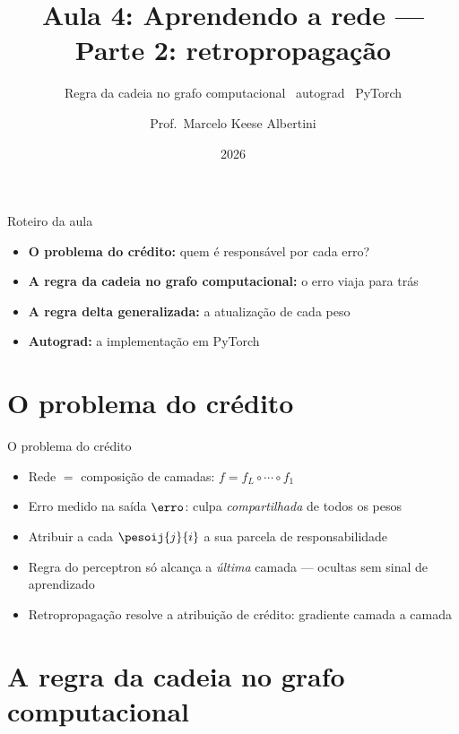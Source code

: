 \documentclass[aspectratio=169, 11pt]{beamer}
\title[Aula 4 — Retropropagação]{Aula 4: Aprendendo a rede — Parte 2: retropropagação}
\subtitle[GBC073 — Inteligência Computacional]{Regra da cadeia no grafo computacional \textbullet\ autograd \textbullet\ PyTorch}
\author[Prof.\ Marcelo Albertini]{Prof.\ Marcelo Keese Albertini}
\institute{GBC073 — Inteligência Computacional \textbullet\ Universidade Federal de Uberlândia}
\date{2026}
\begin{document}
\begin{frame}
  \titlepage
\end{frame}

\begin{frame}{Roteiro da aula}
  \begin{itemize}\setlength{\itemsep}{0.5ex}
    \item<1-> \textbf{O problema do crédito:} quem é responsável por cada erro?
    \item<2-> \textbf{A regra da cadeia no grafo computacional:} o erro viaja para trás
    \item<3-> \textbf{A regra delta generalizada:} a atualização de cada peso
    \item<4-> \textbf{Autograd:} a implementação em PyTorch
  \end{itemize}
\end{frame}

\section{O problema do crédito}

\begin{frame}{O problema do crédito}
  \begin{itemize}\setlength{\itemsep}{0.4ex}
    \item Rede $=$ composição de camadas: $f = f_L \circ \cdots \circ f_1$
    \item Erro medido na saída $\erro$: culpa \emph{compartilhada} de todos os pesos
    \item Atribuir a cada $\pesoij{j}{i}$ a sua parcela de responsabilidade
    \item Regra do perceptron só alcança a \emph{última} camada — ocultas sem
          sinal de aprendizado
    \item Retropropagação resolve a atribuição de crédito: gradiente camada a camada
  \end{itemize}
\end{frame}

\section{A regra da cadeia no grafo computacional}
\end{document}
